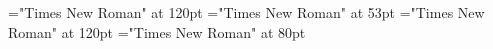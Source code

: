 \documentclass[a4paper]{article}
\begin{document}
 
\pagestyle{plain} 
\font\childaenpa="Times New Roman" at 120pt
\font\childbpa="Times New Roman" at 53pt
\font\childapa="Times New Roman" at 120pt
\font\pa="Times New Roman" at 80pt
\pagestyle{fancy} 


\end{document}
